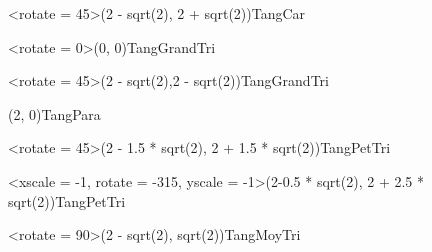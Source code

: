 \documentclass{standalone}
\begin{document}
\begin{EnvTangramTikz}
	\PieceTangram[TangSol]<rotate = 45>({2 - sqrt(2)}, {2 + sqrt(2)}){TangCar}

	\PieceTangram[TangSol]<rotate = 0>({0}, {0}){TangGrandTri}

	\PieceTangram[TangSol]<rotate = 45>({2 - sqrt(2)},{2 - sqrt(2)}){TangGrandTri}

	\PieceTangram[TangSol]({2}, {0}){TangPara}

	\PieceTangram[TangSol]<rotate = 45>({2 - 1.5 * sqrt(2)}, {2 + 1.5 * sqrt(2)}){TangPetTri}

	\PieceTangram[TangSol]<xscale = -1, rotate = -315, yscale = -1>({2-0.5 * sqrt(2)}, {2 + 2.5 * sqrt(2)}){TangPetTri}

	\PieceTangram[TangSol]<rotate = 90>({2 - sqrt(2)}, {sqrt(2)}){TangMoyTri}
\end{EnvTangramTikz}
\end{document}
